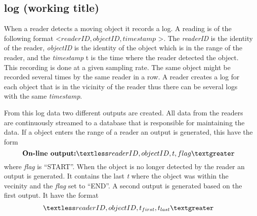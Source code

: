 \subsection{log (working title)}

When a reader detects a moving object it records a log. 
A reading is of the following format \textless $readerID,objectID,timestamp$ \textgreater.
The \textit{readerID} is the identity of the reader, \textit{objectID} is the identity of the object which is in the range of the reader, and the \textit{timestamp} t is the time where the reader detected the object.
This recording is done at a given sampling rate. 
The same object might be recorded several times by the same reader in a row. 
A reader creates a log for each object that is in the vicinity of the reader thus there can be several logs with the same \textit{timestamp}.

From this log data two different outputs are created.
All data from the readers are continuously streamed to a database that is responsible for maintaining the data.
If a object enters the range of a reader an output is generated, this have the form
\begin{equation}
\textbf{On-line output:}
 \textless readerID,objectID,t,flag \textgreater
\end{equation} 
where \textit{flag} is "`START"'. 
When the object is no longer detected by the reader an output is generated. 
It contains the last \textit{t} where the object was within the vecinity and the \textit{flag} set to "`END"'.
A second output is generated based on the first output. 
It have the format 
\begin{align}
\textless\textit{$readerID,objectID,t_{first},t_{last}$}\textgreater
\end{align}


 
